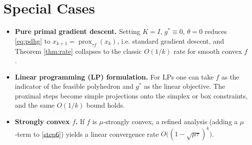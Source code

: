 \documentclass{article}
\begin{document}
\section*{Special Cases}
\begin{itemize}
    \item \textbf{Pure primal gradient descent.}
    Setting $K=I$, $g^{*}\equiv0$, $\theta=0$ reduces \eqref{eq:pdhg} to
    $x_{k+1}= \operatorname{prox}_{\tau f}(x_{k})$, i.e. standard gradient descent,
    and Theorem \ref{thm:rate} collapses to the classic $O(1/k)$ rate for smooth convex $f$.
    \item \textbf{Linear programming (LP) formulation.}
    For LPs one can take $f$ as the indicator of the feasible polyhedron and $g^{*}$ as the linear objective.
    The proximal steps become simple projections onto the simplex or box constraints,
    and the same $O(1/k)$ bound holds.
    \item \textbf{Strongly convex $f$.}
    If $f$ is $\mu$‑strongly convex, a refined analysis (adding a $\mu$‑term to \eqref{step6})
    yields a linear convergence rate $O\bigl((1-\sqrt{\mu\tau})^{k}\bigr)$.
\end{itemize}
\end{document}
